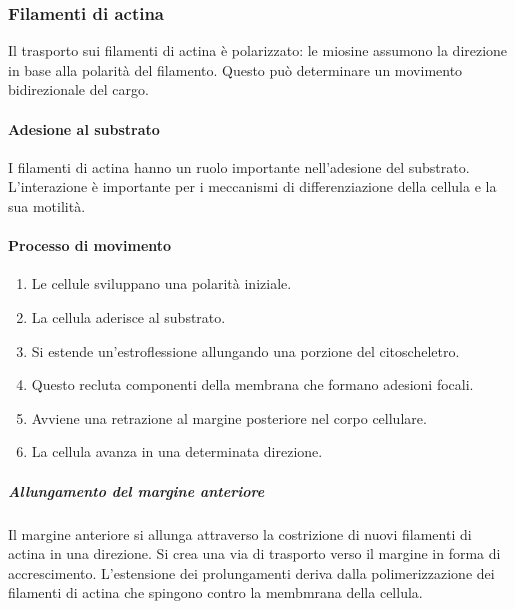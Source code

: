 		\subsubsection{Filamenti di actina}
		Il trasporto sui filamenti di actina \`e polarizzato: le miosine assumono la direzione in base alla polarit\`a del filamento.
		Questo pu\`o determinare un movimento bidirezionale del cargo.
		
			\paragraph{Adesione al substrato}
			I filamenti di actina hanno un ruolo importante nell'adesione del substrato.
			L'interazione \`e importante per i meccanismi di differenziazione della cellula e la sua motilit\`a.
			
			\paragraph{Processo di movimento}
			\begin{multicols}{2}
				\begin{enumerate}
					\item Le cellule sviluppano una polarit\`a iniziale.
					\item La cellula aderisce al substrato.
					\item Si estende un'estroflessione allungando una porzione del citoscheletro.
					\item Questo recluta componenti della membrana che formano adesioni focali.
					\item Avviene una retrazione al margine posteriore nel corpo cellulare.
					\item La cellula avanza in una determinata direzione.
				\end{enumerate}
			\end{multicols}

				\subparagraph{Allungamento del margine anteriore}
				Il margine anteriore si allunga attraverso la costrizione di nuovi filamenti di actina in una direzione.
				Si crea una via di trasporto verso il margine in forma di accrescimento.
				L'estensione dei prolungamenti deriva dalla polimerizzazione dei filamenti di actina che spingono contro la membmrana della cellula.

